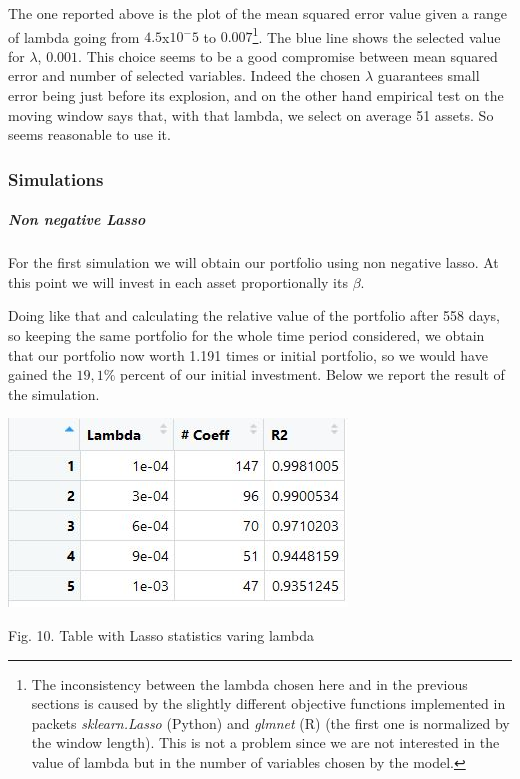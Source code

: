 \documentclass{article}%
\begin{document}
The one reported above is the plot of the mean squared error value given a range of lambda going from $4.5$x$10^-5$ to $0.007$\footnote{The inconsistency between the lambda chosen here and in the previous sections is caused by the slightly different objective functions implemented in packets \textit{sklearn.Lasso} (Python) and  \textit{glmnet} (R) (the first one is normalized by the window length). This is not a problem since we are not interested in the value of lambda but in the number of variables chosen by the model.}. The blue line shows the selected value for $\lambda$, $0.001$. This choice seems to be a good compromise between mean squared error and number of selected variables. Indeed the chosen $\lambda$	guarantees small error being just before its explosion, and on the other hand empirical test on the moving window says that, with that lambda, we select on average 51 assets. So seems reasonable to use it. 
\subsubsection{Simulations}

\subparagraph{Non negative Lasso}
For the first simulation we will obtain our portfolio using non negative lasso. At this point we will invest in each asset proportionally its $\beta$. 

Doing like that and calculating the relative value of the portfolio after 558 days, so keeping the same portfolio for the whole time period considered, we obtain that our portfolio now worth  1.191 times or initial portfolio, so we would have gained the $19,1\%$ percent of our initial investment. Below we report the result of the simulation.
\\
\begin{center}
\includegraphics[scale=0.75]{tablasso}
\begin{center}
\begin{small}
Fig. 10. Table with Lasso statistics varing lambda
\\

\end{small}
\end{center}

\end{center}
\end{document}

